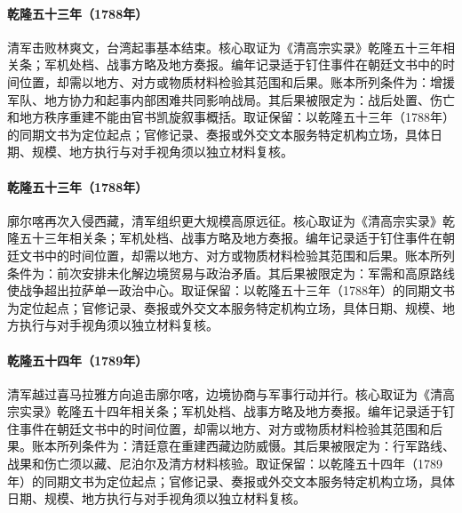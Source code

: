 \hypertarget{ledger:EQ-1788-LIN-SHUANGWEN-DEFEAT}{}\paragraph{乾隆五十三年（1788年）}清军击败林爽文，台湾起事基本结束。核心取证为《清高宗实录》乾隆五十三年相关条；军机处档、战事方略及地方奏报。编年记录适于钉住事件在朝廷文书中的时间位置，却需以地方、对方或物质材料检验其范围和后果。账本所列条件为：增援军队、地方协力和起事内部困难共同影响战局。其后果被限定为：战后处置、伤亡和地方秩序重建不能由官书凯旋叙事概括。取证保留：以乾隆五十三年（1788年）的同期文书为定位起点；官修记录、奏报或外交文本服务特定机构立场，具体日期、规模、地方执行与对手视角须以独立材料复核。
\hypertarget{ledger:EQ-1788-SECOND-GURKHA-WAR}{}\paragraph{乾隆五十三年（1788年）}廓尔喀再次入侵西藏，清军组织更大规模高原远征。核心取证为《清高宗实录》乾隆五十三年相关条；军机处档、战事方略及地方奏报。编年记录适于钉住事件在朝廷文书中的时间位置，却需以地方、对方或物质材料检验其范围和后果。账本所列条件为：前次安排未化解边境贸易与政治矛盾。其后果被限定为：军需和高原路线使战争超出拉萨单一政治中心。取证保留：以乾隆五十三年（1788年）的同期文书为定位起点；官修记录、奏报或外交文本服务特定机构立场，具体日期、规模、地方执行与对手视角须以独立材料复核。
\hypertarget{ledger:EQ-1789-TIBET-NEPAL-CAMPAIGN}{}\paragraph{乾隆五十四年（1789年）}清军越过喜马拉雅方向追击廓尔喀，边境协商与军事行动并行。核心取证为《清高宗实录》乾隆五十四年相关条；军机处档、战事方略及地方奏报。编年记录适于钉住事件在朝廷文书中的时间位置，却需以地方、对方或物质材料检验其范围和后果。账本所列条件为：清廷意在重建西藏边防威慑。其后果被限定为：行军路线、战果和伤亡须以藏、尼泊尔及清方材料核验。取证保留：以乾隆五十四年（1789年）的同期文书为定位起点；官修记录、奏报或外交文本服务特定机构立场，具体日期、规模、地方执行与对手视角须以独立材料复核。

